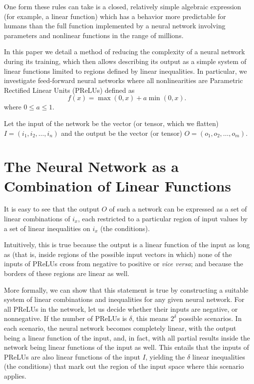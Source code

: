 \documentclass{article}[12pt]
\begin{document}
One form these rules can take is a closed, relatively simple algebraic
expression (for example, a linear function) which has a behavior more
predictable for humans than the full function implemented by a neural
network involving parameters and nonlinear functions in the range of
millions.

In this paper we detail a method of reducing the complexity of a neural
network during its training, which then allows describing its output as a
simple system of linear functions limited to regions defined by linear
inequalities.
In particular,
we investigate feed-forward neural networks
where all nonlinearities are Parametric Rectified Linear Units (PReLUs)
defined as
\[ f(x) = \max(0, x) + a \min(0, x). \]
where $0\leq a\leq 1$.\cite{PR}

Let the input of the network be the vector (or tensor, which we flatten) $I=(i_1, i_2, \ldots, i_n)$
and the output be the vector (or tensor) $O=(o_1, o_2, \ldots, o_m)$.

\section{The Neural Network as a Combination of Linear Functions}

It is easy to see that the output $O$ of such a network can be expressed
as a set of linear combinations of $i_x$, each restricted to a particular region of input values
by a set of linear inequalities on $i_x$ (the conditions).

Intuitively, this is true because the output is a linear function of the input
as long as (that is, inside regions of the possible input vectors in which) none of the inputs of PReLUs
cross from negative to positive or \emph{vice versa}; and because the borders of these regions
are linear as well.

More formally, we can show that this statement is true by constructing a suitable
system of linear combinations and inequalities for any given neural network.
For all PReLUs in the network, let us decide whether their inputs are negative, or nonnegative.
If the number of PReLUs is $\delta$, this means $2^\delta$ possible scenarios.
In each scenario, the neural network becomes completely linear, with the output being a linear function of the input,
and, in fact, with all partial results inside the network being linear functions of the input as well.
This entails that the inputs of PReLUs are also linear functions of the input $I$, yielding
the $\delta$ linear inequalities (the conditions) that mark out the region of the input space where this scenario applies.
\end{document}
